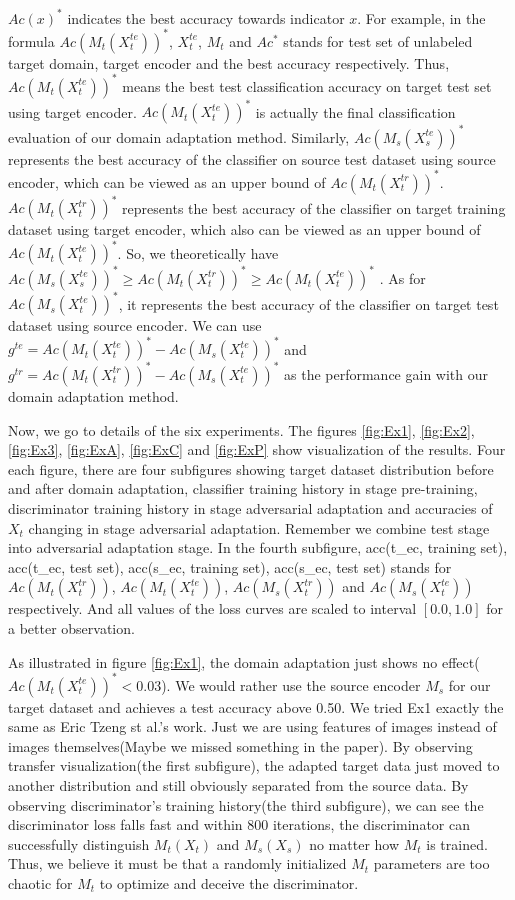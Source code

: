 \documentclass[conference]{IEEEtran}
\begin{document}
$Ac(x)^*$ indicates the best accuracy towards indicator $x$. For example, in the formula $Ac(M_t(X^{te}_t))^*$, $X^{te}_t$, $M_t$ and $Ac^*$ stands for test set of unlabeled target domain, target encoder and the best accuracy respectively. Thus, $Ac(M_t(X^{te}_t))^*$ means the best test classification accuracy on target test set using target encoder. $Ac(M_t(X^{te}_t))^*$ is actually the final classification evaluation of our domain adaptation method. Similarly, $Ac(M_s(X^{te}_s))^*$ represents the best accuracy of the classifier on source test dataset using source encoder, which can be viewed as an upper bound of $Ac(M_t(X^{tr}_t))^*$. $Ac(M_t(X^{tr}_t))^*$ represents the best accuracy of the classifier on target training dataset using target encoder, which also can be viewed as an upper bound of $Ac(M_t(X^{te}_t))^*$. So, we theoretically have $Ac(M_s(X^{te}_s))^* \geq Ac(M_t(X^{tr}_t))^* \geq Ac(M_t(X^{te}_t))^*$ . As for $Ac(M_s(X^{te}_t))^*$, it represents the best accuracy of the classifier on target test dataset using source encoder. We can use $g^{te}=Ac(M_t(X^{te}_t))^*-Ac(M_s(X^{te}_t))^*$ and $g^{tr}=Ac(M_t(X^{tr}_t))^*-Ac(M_s(X^{te}_t))^*$ as the performance gain with our domain adaptation method.

Now, we go to details of the six experiments. The figures \ref{fig:Ex1}, \ref{fig:Ex2}, \ref{fig:Ex3}, \ref{fig:ExA}, \ref{fig:ExC} and \ref{fig:ExP} show visualization of the results. Four each figure, there are four subfigures showing target dataset  distribution before and after domain adaptation, classifier training history in stage pre-training, discriminator training history in stage adversarial adaptation and accuracies of $X_t$ changing in stage adversarial adaptation. Remember we combine test stage into adversarial adaptation stage. In the fourth subfigure, acc(t\_ec, training set), acc(t\_ec, test set), acc(s\_ec, training set), acc(s\_ec, test set) stands for $Ac(M_t(X^{tr}_t))$, $Ac(M_t(X^{te}_t))$, $Ac(M_s(X^{tr}_t))$ and $Ac(M_s(X^{te}_t))$ respectively. And all values of the loss curves are scaled to interval $[0.0, 1.0]$ for a better observation.

As illustrated in figure \ref{fig:Ex1}, the domain adaptation just shows no effect($Ac(M_t(X^{te}_t))^* < 0.03$). We would rather use the source encoder $M_s$ for our target dataset and achieves a test accuracy above 0.50. We tried Ex1 exactly the same as Eric Tzeng st al.'s work. Just we are using features of images instead of images themselves(Maybe we missed something in the paper). By observing transfer visualization(the first subfigure), the adapted target data just moved to another distribution and still obviously separated from the source data. By observing discriminator's training history(the third subfigure), we can see the discriminator loss falls fast and within 800 iterations, the discriminator can successfully distinguish $M_t(X_t)$ and $M_s(X_s)$ no matter how $M_t$ is trained. Thus, we believe it must be that a randomly initialized $M_t$ parameters are too chaotic for $M_t$ to optimize and deceive the discriminator.
\end{document}
